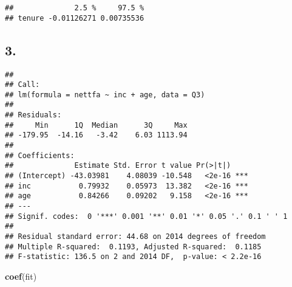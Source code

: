 \documentclass[
]{article}
\newenvironment{Shaded}{\begin{snugshade}}{\end{snugshade}}
\newcommand{\DataTypeTok}[1]{\textcolor[rgb]{0.13,0.29,0.53}{#1}}
\newcommand{\DecValTok}[1]{\textcolor[rgb]{0.00,0.00,0.81}{#1}}
\newcommand{\FloatTok}[1]{\textcolor[rgb]{0.00,0.00,0.81}{#1}}
\newcommand{\KeywordTok}[1]{\textcolor[rgb]{0.13,0.29,0.53}{\textbf{#1}}}
\newcommand{\NormalTok}[1]{#1}
\newcommand{\OperatorTok}[1]{\textcolor[rgb]{0.81,0.36,0.00}{\textbf{#1}}}
\newcommand{\StringTok}[1]{\textcolor[rgb]{0.31,0.60,0.02}{#1}}
\begin{document}
\begin{Shaded}
\end{Shaded}

\begin{verbatim}
##              2.5 %     97.5 %
## tenure -0.01126271 0.00735536
\end{verbatim}

\hypertarget{section-2}{%
\subsection{3.}\label{section-2}}

\begin{Shaded}
\end{Shaded}

\begin{verbatim}
## 
## Call:
## lm(formula = nettfa ~ inc + age, data = Q3)
## 
## Residuals:
##     Min      1Q  Median      3Q     Max 
## -179.95  -14.16   -3.42    6.03 1113.94 
## 
## Coefficients:
##              Estimate Std. Error t value Pr(>|t|)    
## (Intercept) -43.03981    4.08039 -10.548   <2e-16 ***
## inc           0.79932    0.05973  13.382   <2e-16 ***
## age           0.84266    0.09202   9.158   <2e-16 ***
## ---
## Signif. codes:  0 '***' 0.001 '**' 0.01 '*' 0.05 '.' 0.1 ' ' 1
## 
## Residual standard error: 44.68 on 2014 degrees of freedom
## Multiple R-squared:  0.1193, Adjusted R-squared:  0.1185 
## F-statistic: 136.5 on 2 and 2014 DF,  p-value: < 2.2e-16
\end{verbatim}

\begin{Shaded}
\begin{Highlighting}[]
\KeywordTok{coef}\NormalTok{(fit)}
\end{Highlighting}
\end{Shaded}
\end{document}
